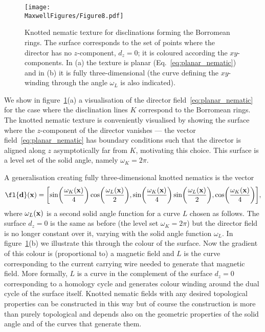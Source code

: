     \begin{figure}[htbp]
        \centering
        \texttt{[image: \\MaxwellFigures/Figure8.pdf]}
        \caption{Knotted nematic texture for disclinations forming the Borromean rings. The surface corresponds to the set of points where the director has no $z$-component, $d_z=0$; it is coloured according the $xy$-components. In (a) the texture is planar (Eq.~\eqref{eq:planar_nematic}) and in (b) it is fully three-dimensional (the curve defining the $xy$-winding through the angle $\omega_L$ is also indicated).}
        \label{fig:nematic}
    \end{figure}

    We show in figure~\ref{fig:nematic}(a) a visualisation of the director field~\eqref{eq:planar_nematic} for the case where the disclination lines $K$ correspond to the Borromean rings. The knotted nematic texture is conveniently visualised by showing the surface where the $z$-component of the director vanishes --- the vector field~\eqref{eq:planar_nematic} has boundary conditions such that the director is aligned along $z$ asymptotically far from $K$, motivating this choice. This surface is a level set of the solid angle, namely $\omega_{K}=2\pi$. 

    A generalisation creating fully three-dimensional knotted nematics is the vector 
    \begin{equation}
        \fl    {\bf d}({\bf x}) = \biggl[ \sin\biggl(\frac{\omega_{K}({\bf x})}{4}\biggr) \cos\biggl(\frac{\omega_{L}({\bf x})}{2}\biggr) , \sin\biggl(\frac{\omega_{K}({\bf x})}{4}\biggr) \sin\biggl(\frac{\omega_{L}({\bf x})}{2}\biggr) , \cos\biggl(\frac{\omega_{K}({\bf x})}{4}\biggr)  \biggr] ,
        \label{eq:nonplanar_nematic}
    \end{equation}
    where $\omega_{L}({\bf x})$ is a second solid angle function for a curve $L$ chosen as follows. The surface $d_z=0$ is the same as before (the level set $\omega_{K}=2\pi$) but the director field is no longer constant over it, varying with the solid angle function $\omega_{L}$. In figure~\ref{fig:nematic}(b) we illustrate this through the colour of the surface. Now the gradient of this colour is (proportional to) a magnetic field and $L$ is the curve corresponding to the current carrying wire needed to generate that magnetic field. More formally, $L$ is a curve in the complement of the surface $d_z=0$ corresponding to a homology cycle and generates colour winding around the dual cycle of the surface itself. Knotted nematic fields with any desired topological properties can be constructed in this way but of course the construction is more than purely topological and depends also on the geometric properties of the solid angle and of the curves that generate them. 

